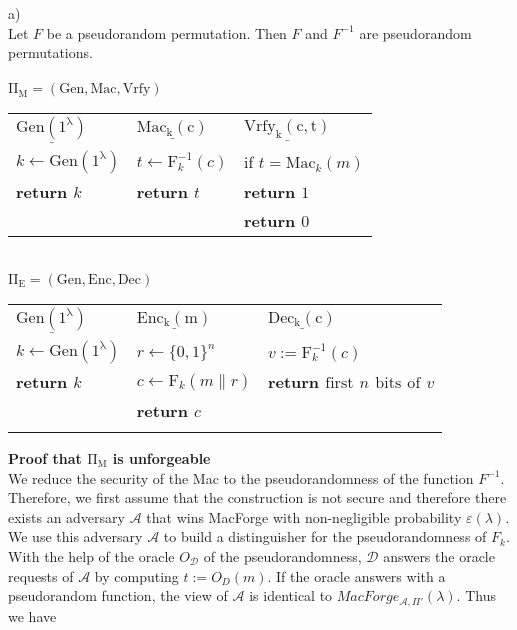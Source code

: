 
a)\\
Let $F$ be a pseudorandom permutation. Then $F$ and $F^{-1}$ are pseudorandom permutations.\\
\\
$\mathrm{\Pi_{M} = (Gen, Mac, Vrfy)}$\\
\vskip 0.05in
\begin{tabular}{l@{\hskip 1in}l@{\hskip 0.5in}l}
$\underline{\mathrm{Gen(1^{\lambda })}}$ & $\underline{\mathrm{Mac_{k}(c)}}$ & $\underline{\mathrm{Vrfy_{k}(c,t)}}$ \\
$k \leftarrow \mathrm{Gen(1^{\lambda})}$ & $t \leftarrow \mathrm{F}_{k}^{-1}(c)$ & if $t = \mathrm{Mac}_{k}(m)$\\
\bf{return} $k$ & \bf{return} $t$ & \indent\bf{return} $1$\\
 & & \bf{return} $0$\\
\end{tabular}\\
\vskip 1cm
\noindent$\mathrm{\Pi_{E} = (Gen, Enc, Dec)}$\\
\vskip 0.05in
\begin{tabular}{l@{\hskip 1in}l@{\hskip 0.5in}l}
$\underline{\mathrm{Gen(1^{\lambda })}}$ & $\underline{\mathrm{Enc_{k}(m)}}$ & $\underline{\mathrm{Dec_{k}(c)}}$ \\
$k \leftarrow \mathrm{Gen(1^{\lambda})}$ & $r \leftarrow \{0,1\}^{n}$ & $v := \mathrm{F}_{k}^{-1}(c)$\\
\bf{return} $k$ & $c \leftarrow \mathrm{F}_{k}(m \parallel r)$ & \bf{return} $\mathrm{first}$ $n$ $\mathrm{bits}$ $\mathrm{of}$  $v$  \\
 & \bf{return} $c$ &  \\
 & & \\
\end{tabular}
\vskip 1cm
\noindent\textbf{Proof that $\mathrm{\Pi_{M}}$ is unforgeable}\\

We reduce the security of the Mac to the pseudorandomness of the function $F^{-1}$.\\

Therefore, we first assume that the construction is not secure and therefore there exists an adversary $\mathcal{A}$ that wins MacForge with non-negligible probability $\varepsilon(\lambda )$. We use this adversary $\mathcal{A}$ to build a distinguisher for the pseudorandomness of $F_{k}$.\\

With the help of the oracle $O_{\mathcal{D}}$ of the pseudorandomness, $\mathcal{D}$ answers the oracle requests of $\mathcal{A}$ by computing $t := O_{D}(m)$. If the oracle answers with a pseudorandom function, the view of $\mathcal{A}$ is identical to $MacForge_{\mathcal{A},\Pi'}(\lambda)$. Thus we have \\

